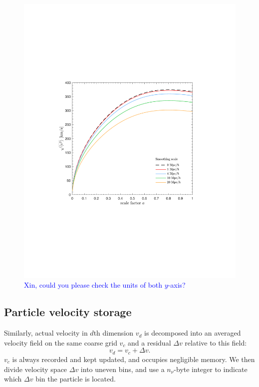 \documentclass[10pt,twocolumn,preprint]{emulateapj}
\newcommand{\tcb}{\textcolor{blue}}
\begin{document}
\begin{figure}
\centering
  \includegraphics[width=1.0\linewidth]{vdisp.pdf}
 \caption{\tcb{Xin, could you please check the units of both $y$-axis?}}
\label{fig.vdisp}
\end{figure}

\subsection{Particle velocity storage}\label{ss.velocity}
Similarly, actual velocity in $d$th dimension $v_d$ is decomposed into an 
averaged velocity field on the same coarse grid $v_c$ and a residual $\Delta v$ 
relative to this field: 
\begin{equation}
	v_d=v_c+\Delta v.
\end{equation}
$v_c$ is always recorded and 
kept updated, and occupies negligible memory. We then divide velocity space 
$\Delta v$ into uneven bins, and use a $n_\nu$-byte integer to indicate
which $\Delta v$ bin the particle is located.
\end{document}
